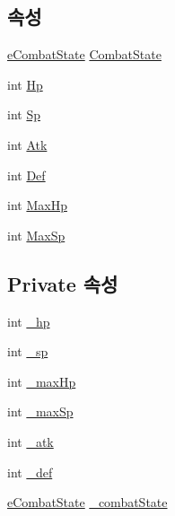 \subsection*{속성}
\begin{DoxyCompactItemize}
\item 
\hyperlink{_combat_object_8cs_ae6d9f4a8ae9fffcdf1a546168a44f917}{e\+Combat\+State} \hyperlink{class_combat_instance_a149d2068f3dc0ec72f3461d101dcebab}{Combat\+State}
\item 
int \hyperlink{class_combat_instance_ae4682b727ea05a59141f747341877eb6}{Hp}
\item 
int \hyperlink{class_combat_instance_a120995296719b1fb1fa4cc55721ddba4}{Sp}
\item 
int \hyperlink{class_combat_instance_a9de7c50888b56d9854709d132e69baa9}{Atk}
\item 
int \hyperlink{class_combat_instance_ab52acfd86a70be3647d2f092e6816190}{Def}
\item 
int \hyperlink{class_combat_instance_a33c5218456253d1a5c457fe6364b10d7}{Max\+Hp}
\item 
int \hyperlink{class_combat_instance_ad1d6d4d72223021bd0130b069437463d}{Max\+Sp}
\end{DoxyCompactItemize}
\subsection*{Private 속성}
\begin{DoxyCompactItemize}
\item 
int \hyperlink{class_combat_instance_a392329b865aa88f2a579fcb7e7a0a99b}{\+\_\+hp}
\item 
int \hyperlink{class_combat_instance_a3a9ee2ea52b19b5150386b52396621f9}{\+\_\+sp}
\item 
int \hyperlink{class_combat_instance_afce9395cdf3a359fb6eb982c0bf7f063}{\+\_\+max\+Hp}
\item 
int \hyperlink{class_combat_instance_a2489b1182b81f028cfd45f26fb2a7af0}{\+\_\+max\+Sp}
\item 
int \hyperlink{class_combat_instance_a7107dad81ca2638ed2ad30de391029e6}{\+\_\+atk}
\item 
int \hyperlink{class_combat_instance_a1c2bc3e91c7e2fee8b5d5f489eaa3d40}{\+\_\+def}
\item 
\hyperlink{_combat_object_8cs_ae6d9f4a8ae9fffcdf1a546168a44f917}{e\+Combat\+State} \hyperlink{class_combat_instance_a6352b66ef39484c9d76b03df56d26ee4}{\+\_\+combat\+State}
\end{DoxyCompactItemize}


